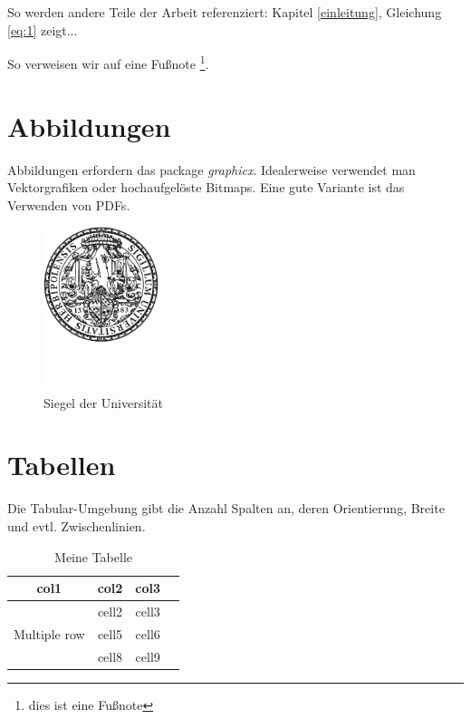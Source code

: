 \documentclass[12pt,oneside]{article}
\begin{document}
So werden andere Teile der Arbeit referenziert: Kapitel \ref{einleitung}, Gleichung \ref{eq:1} zeigt...

So verweisen wir auf eine Fußnote \footnote{dies ist eine Fußnote}.

\section{Abbildungen}

Abbildungen erfordern das package \textit{graphicx}. 
Idealerweise verwendet man Vektorgrafiken oder hochaufgelöste Bitmaps. 
Eine gute Variante ist das Verwenden von PDFs.

\begin{figure}[h]
    \centering
    \includegraphics[width=0.3\textwidth]{siegel.pdf}
    \caption{Siegel der Universität}
    \label{fig:my_label}
\end{figure}


\section{Tabellen}

Die Tabular-Umgebung gibt die Anzahl Spalten an, deren Orientierung, Breite und evtl. Zwischenlinien. 


\begin{table}[ht]
    \centering
    \caption{Meine Tabelle}
        \begin{tabular}{ cccc } 
        \toprule
        col1 & col2 & col3 \\
        \midrule
        \multirow{3}{4em}{Multiple row} & cell2 & cell3 \\ 
        & cell5 & cell6 \\ 
        & cell8 & cell9 \\ 
        \bottomrule
    \end{tabular}
    \label{tab:countries}
\end{table}
\end{document}
